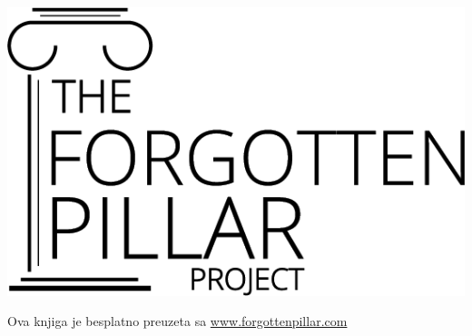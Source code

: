 {%
\noindent
\begin{minipage}{0.3\textwidth}
    \includegraphics[width=\linewidth]{images/logo-black.png}
\end{minipage}%
\hfill
\begin{minipage}{\dimexpr\linewidth-0.3\textwidth-0.2\textwidth-1em\relax}
    \raggedleft\footnotesize
    Ova knjiga je besplatno preuzeta sa \href{https://forgottenpillar.com/book/the-forgotten-pillar}{www.forgottenpillar.com}
\end{minipage}%
\hfill
\begin{minipage}{0.125\textwidth}
    \centering
\end{minipage}
}